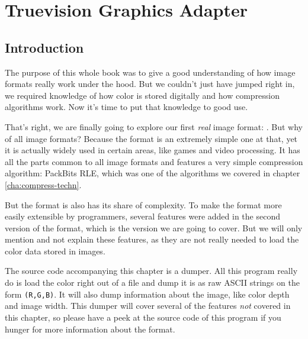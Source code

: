 \begin{comment}
  
\end{comment}

\chapter{Truevision Graphics Adapter}
\label{cha:tga}

\begin{refsection}

  \section{Introduction}
  \label{sec:tga-introduction}

  The  purpose of this whole book was to give a good understanding of
  how image formats really work under the hood. But we couldn't just
  have jumped right in, we required knowledge of how color is stored
  digitally and how compression algorithms work. Now it's time to put
  that knowledge to good use.

  That's right, we are finally going to explore our first \textit{real} image format:
  \tga{}. But why \tga of all image formats? Because the
  format is an extremely simple one at that, yet it is actually widely
  used in certain areas, like games and video processing. It has all
  the parts common to all image formats and features a very simple
  compression algorithm: PackBits RLE, which was one of the algorithms
  we covered in chapter \ref{cha:compress-techn}.

  But the \tga format is also has its share of complexity. To make the
  format more easily extensible by programmers, several features were
  added in the second version of the format, which is the version we
  are going to cover. But we will only mention and not explain these
  features, as they are not really needed to load the color data
  stored in \tga images.

  The source code accompanying this chapter is a \tga dumper. All this
  program really do is load the color right out of a \tga file and
  dump it is as raw ASCII strings on the form \verb|(R,G,B)|. It will
  also dump information about the image, like color depth and image
  width.  This dumper will cover several of the features \textit{not}
  covered in this chapter, so please have a peek at the source code of
  this program if you hunger for more information about the \tga
  format.


\end{refsection}
